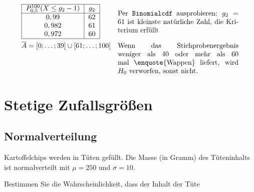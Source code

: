 \documentclass[10pt]{article}
\begin{document}
\begin{example}
\begin{align*}
& \begin{tabular}{|c|c|}
	\hline
	$P^{100}_{0,5}(X \leq g_2 - 1)$ & $g_2$ \\ \hline
	$0,99$ & $62$ \\
	$0,982$ & $61$ \\
	$0,972$ & $60$ \\
	\hline
	\end{tabular} &\parbox{0.5\linewidth}{Per \texttt{Binomialcdf} ausprobieren; $g_2 = 61$ ist kleinste natürliche Zahl, die Kriterium erfüllt}\\
&\overline A = [0;\dots;39] \cup [61;\dots;100] &\parbox[t]{0.5\linewidth}{Wenn das Stichprobenergebnis weniger als $40$ oder mehr als $60$ mal \enquote{Wappen} liefert, wird $H_0$ verworfen, sonst nicht.}
\end{align*}
\end{example}

\newpage
\section{Stetige Zufallsgrößen}
\subsection{Normalverteilung}
\begin{example}
Kartoffelchips werden in Tüten gefüllt. Die Masse (in Gramm) des Tüteninhalts
ist normalverteilt mit $\mu = 250$ und $\sigma = 10$.

Bestimmen Sie die Wahrscheinlichkeit, dass der Inhalt der Tüte
\end{example}
\end{document}
